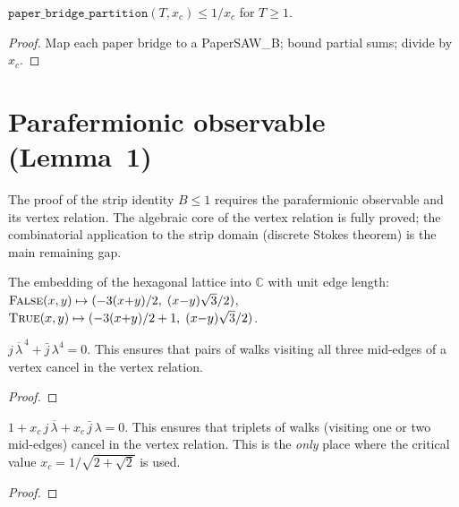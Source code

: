 \begin{theorem}\label{thm:paper_bridge_upper}
\leanok
{}
  $\texttt{paper\_bridge\_partition}(T, x_c) \leq 1/x_c$ for $T \geq 1$.
\end{theorem}
\begin{proof}
\leanok
{}
  Map each paper bridge to a PaperSAW\_B; bound partial sums;
  divide by $x_c$.
\end{proof}

\section{Parafermionic observable (Lemma~1)}

The proof of the strip identity $B \leq 1$ requires the parafermionic
observable and its vertex relation.  The algebraic core of the vertex
relation is fully proved; the combinatorial application to the strip
domain (discrete Stokes theorem) is the main remaining gap.

\begin{definition}\label{def:hex_embed_correct}
\leanok
{}
  The embedding of the hexagonal lattice into $\mathbb{C}$ with unit edge length:
  $\textsc{False}(x,y) \mapsto (-3(x{+}y)/2,\; (x{-}y)\sqrt{3}/2)$,
  $\textsc{True}(x,y) \mapsto (-3(x{+}y)/2 + 1,\; (x{-}y)\sqrt{3}/2)$.
\end{definition}

\begin{theorem}\label{thm:pair_cancel}
\leanok
  $j\,\overline{\lambda}^{\,4} + \bar{j}\,\lambda^4 = 0$.
  This ensures that pairs of walks visiting all three mid-edges of a vertex
  cancel in the vertex relation.
\end{theorem}
\begin{proof}
\leanok
\end{proof}

\begin{theorem}\label{thm:triplet_cancel}
\leanok
  $1 + x_c\,j\,\overline{\lambda} + x_c\,\bar{j}\,\lambda = 0$.
  This ensures that triplets of walks (visiting one or two mid-edges)
  cancel in the vertex relation.  This is the \emph{only} place where
  the critical value $x_c = 1/\sqrt{2+\sqrt{2}}$ is used.
\end{theorem}
\begin{proof}
\leanok
\end{proof}

